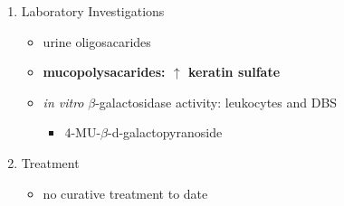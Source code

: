 \documentclass{scrartcl}
\begin{document}
\begin{enumerate}
\item Laboratory Investigations
\label{sec:org9e55bcd}
\begin{itemize}
\item urine oligosacarides
\item \textbf{mucopolysacarides: \(\uparrow\) keratin sulfate}
\item \emph{in vitro} \(\beta\)-galactosidase activity: leukocytes and DBS
\begin{itemize}
\item 4-MU-\(\beta\)-d-galactopyranoside
\end{itemize}
\end{itemize}

\item Treatment
\label{sec:org7485580}
\begin{itemize}
\item no curative treatment to date
\end{itemize}
\end{enumerate}
\end{document}
